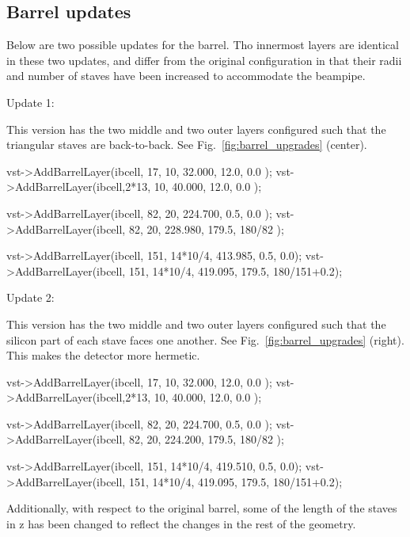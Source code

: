 \documentclass[12pt]{article}
\begin{document}
\subsection{Barrel updates}

Below are two possible updates for the barrel. Tho innermost layers are identical in these two updates,
and differ from the original configuration in that their radii and number of staves have been increased to accommodate the
beampipe.

Update 1:

This version has the two middle and two outer layers configured such that the triangular
staves are back-to-back. See Fig.~\ref{fig:barrel_upgrades} (center).
\begin{tcolorbox}
\begin{verbnobox}[\scriptsize]
vst->AddBarrelLayer(ibcell,  17,      10,  32.000,  12.0, 0.0        );
vst->AddBarrelLayer(ibcell,2*13,      10,  40.000,  12.0, 0.0        );

vst->AddBarrelLayer(ibcell,  82,      20, 224.700,   0.5, 0.0        );
vst->AddBarrelLayer(ibcell,  82,      20, 228.980, 179.5, 180/82     );

vst->AddBarrelLayer(ibcell, 151, 14*10/4, 413.985,   0.5,         0.0);
vst->AddBarrelLayer(ibcell, 151, 14*10/4, 419.095, 179.5, 180/151+0.2);
\end{verbnobox}  
\end{tcolorbox}

Update 2:

This version has the two middle and two outer layers configured such that the silicon part of each stave
faces one another. See Fig.~\ref{fig:barrel_upgrades} (right). This makes the detector more hermetic.
\begin{tcolorbox}
\begin{verbnobox}[\scriptsize]
vst->AddBarrelLayer(ibcell,  17,      10,  32.000,  12.0, 0.0        );
vst->AddBarrelLayer(ibcell,2*13,      10,  40.000,  12.0, 0.0        );

vst->AddBarrelLayer(ibcell,  82,      20, 224.700,   0.5, 0.0        );
vst->AddBarrelLayer(ibcell,  82,      20, 224.200, 179.5, 180/82     );

vst->AddBarrelLayer(ibcell, 151, 14*10/4, 419.510,   0.5,         0.0);
vst->AddBarrelLayer(ibcell, 151, 14*10/4, 419.095, 179.5, 180/151+0.2);
\end{verbnobox}  
\end{tcolorbox}

Additionally, with respect to the original barrel, some of the length of the staves in z has been changed
to reflect the changes in the rest of the geometry.
\end{document}
